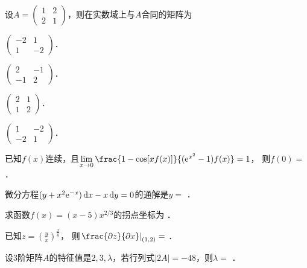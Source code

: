 \documentclass[plain,noanswer,medmath]{../../template/jnuexam}
\begin{document}


\begin{problem}
设$A = \begin{pmatrix}
  1 & 2 \\
  2 & 1
\end{pmatrix}$，则在实数域上与$A$合同的矩阵为\pickout{}
\begin{abcd}
\item $\begin{pmatrix}
  -2 & 1 \\
   1 & -2
\end{pmatrix}$．
\item $\begin{pmatrix}
   2 & -1 \\
  -1 & 2
\end{pmatrix}$．
\item $\begin{pmatrix}
  2 & 1 \\
  1 & 2
\end{pmatrix}$．
\item $\begin{pmatrix}
   1 & -2 \\
  -2 & 1
\end{pmatrix}$．
\end{abcd}
\end{problem}




\begin{problem}
已知$f(x)$连续，且$\lim_{x \to 0} \frac{1 - \cos[xf(x)]}{(\e^{x^2} - 1)f(x)} = 1$，
则$f(0) =$ \fillin{}．
\end{problem}


\begin{problem}
微分方程$(y + x^2\mathrm{e}^{- x})\mathop{}\!\mathrm{d} x - x\mathop{}\!\mathrm{d} y = 0$的通解是$y =$ \fillin{}．
\end{problem}




\begin{problem}
求函数$f(x) = (x - 5)x^{2/3}$的拐点坐标为 \fillin{}．
\end{problem}


\begin{problem}
已知$z = \left(\frac{y}{x} \right)^{\frac{x}{y}}$，
则$\left. \frac{\pdz}{\pdx} \right|_{(1,2)} =$ \fillin{}．
\end{problem}


\begin{problem}
设$3$阶矩阵$A$的特征值是$2,3,\lambda$，若行列式$|2A| = - 48$，则$\lambda =$ \fillin{}．
\end{problem}
\end{document}
